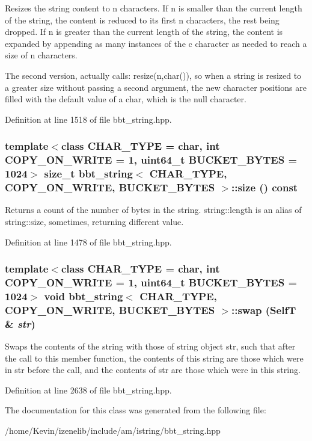 Resizes the string content to n characters. If n is smaller than the current length of the string, the content is reduced to its first n characters, the rest being dropped. If n is greater than the current length of the string, the content is expanded by appending as many instances of the c character as needed to reach a size of n characters.

The second version, actually calls: resize(n,char()), so when a string is resized to a greater size without passing a second argument, the new character positions are filled with the default value of a char, which is the null character. 

Definition at line 1518 of file bbt\_\-string.hpp.\hypertarget{classbbt__string_d702780b8d0a6de141d9a02ab0b7b0a0}{
\subsubsection[{size}]{\setlength{\rightskip}{0pt plus 5cm}template$<$class CHAR\_\-TYPE  = char, int COPY\_\-ON\_\-WRITE = 1, uint64\_\-t BUCKET\_\-BYTES = 1024$>$ size\_\-t {\bf bbt\_\-string}$<$ CHAR\_\-TYPE, COPY\_\-ON\_\-WRITE, BUCKET\_\-BYTES $>$::size () const}}
\label{classbbt__string_d702780b8d0a6de141d9a02ab0b7b0a0}


Returns a count of the number of bytes in the string. string::length is an alias of string::size, sometimes, returning different value. 

Definition at line 1478 of file bbt\_\-string.hpp.\hypertarget{classbbt__string_04e661fd40f8134bff1b427e08603786}{
\subsubsection[{swap}]{\setlength{\rightskip}{0pt plus 5cm}template$<$class CHAR\_\-TYPE  = char, int COPY\_\-ON\_\-WRITE = 1, uint64\_\-t BUCKET\_\-BYTES = 1024$>$ void {\bf bbt\_\-string}$<$ CHAR\_\-TYPE, COPY\_\-ON\_\-WRITE, BUCKET\_\-BYTES $>$::swap ({\bf SelfT} \& {\em str})}}
\label{classbbt__string_04e661fd40f8134bff1b427e08603786}


Swaps the contents of the string with those of string object str, such that after the call to this member function, the contents of this string are those which were in str before the call, and the contents of str are those which were in this string. 

Definition at line 2638 of file bbt\_\-string.hpp.

The documentation for this class was generated from the following file:\begin{CompactItemize}
\item 
/home/Kevin/izenelib/include/am/istring/bbt\_\-string.hpp\end{CompactItemize}
